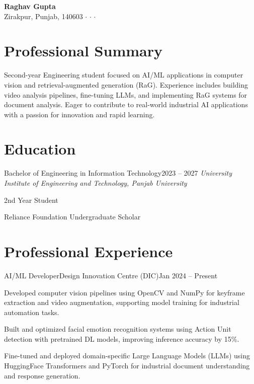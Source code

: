 \documentclass[10pt, letterpaper]{article}
\newcommand{\contactdivider}{\hspace{0.2cm}$\cdot$\hspace{0.2cm}}
\newcommand{\headernamestyle}[1]{{\fontsize{28pt}{32pt}\selectfont\textbf{#1}}}
\begin{document}
\begin{center}
    \headernamestyle{Raghav Gupta}\\[0.25cm]
    \footnotesize
    {\faMapMarker*} Zirakpur, Punjab, 140603 \contactdivider
     \contactdivider
     \contactdivider
\end{center}

\section{Professional Summary}
\begin{minipage}{\linewidth}
Second-year Engineering student focused on AI/ML applications in computer vision and retrieval-augmented generation (RaG). Experience includes building video analysis pipelines, fine-tuning LLMs, and implementing RaG systems for document analysis. Eager to contribute to real-world industrial AI applications with a passion for innovation and rapid learning.
\end{minipage}

\section{Education}
\begin{educationentry}{Bachelor of Engineering in Information Technology}{2023 -- 2027}
\textit{University Institute of Engineering and Technology, Panjab University}
\begin{achievementlist}
    \item 2nd Year Student
    \item Reliance Foundation Undergraduate Scholar
\end{achievementlist}
\end{educationentry}

\section{Professional Experience}
\begin{experienceentry}{AI/ML Developer}{Design Innovation Centre (DIC)}{Jan 2024 -- Present}
    \item Developed computer vision pipelines using OpenCV and NumPy for keyframe extraction and video augmentation, supporting model training for industrial automation tasks.
    \item Built and optimized facial emotion recognition systems using Action Unit detection with pretrained DL models, improving inference accuracy by 15\%.
    \item Fine-tuned and deployed domain-specific Large Language Models (LLMs) using HuggingFace Transformers and PyTorch for industrial document understanding and response generation.
\end{experienceentry}
\end{document}
